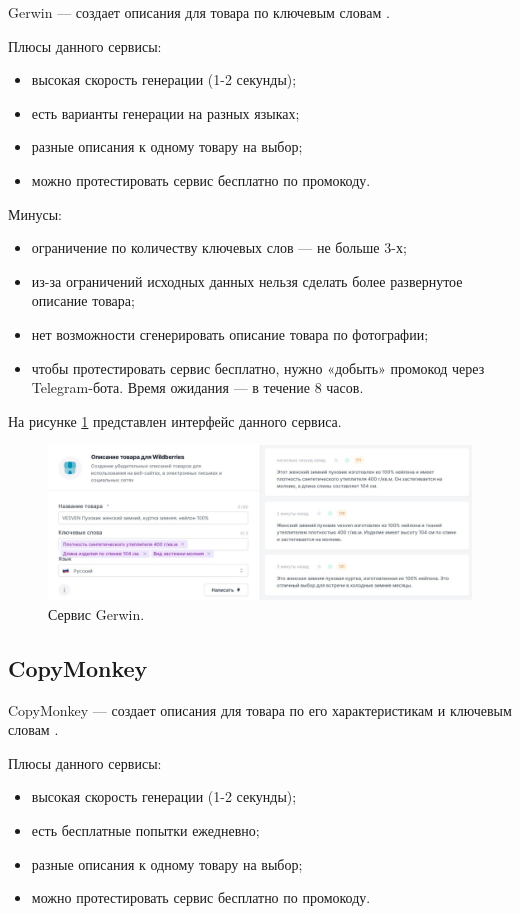 \documentclass[a4paper,12pt]{extarticle}
\begin{document}
Gerwin — создает описания для товара по ключевым словам \cite{gerwin}.

Плюсы данного сервисы:
\begin{itemize}
	\item высокая скорость генерации (1-2 секунды);
	\item есть варианты генерации на разных языках;
	\item разные описания к одному товару на выбор;
	\item можно протестировать сервис бесплатно по промокоду.
\end{itemize}

Минусы:
\begin{itemize}
	\item ограничение по количеству ключевых слов — не больше 3-х;
	\item из-за ограничений исходных данных нельзя сделать более развернутое описание товара;
	\item нет возможности сгенерировать описание товара по фотографии;
	\item чтобы протестировать сервис бесплатно, нужно «добыть» промокод через Telegram-бота. Время ожидания — в течение 8 часов.
\end{itemize}

На рисунке \ref{fig:gerwin} представлен интерфейс данного сервиса.

\begin{figure}[ht]
	\centering
	\includegraphics[scale=0.15]{gerwin.png}
	\caption{Сервис Gerwin.}
	\label{fig:gerwin}
\end{figure}

\newpage
\subsection{CopyMonkey}

CopyMonkey — создает описания для товара по его характеристикам и ключевым словам \cite{copymonkey}.

Плюсы данного сервисы:
\begin{itemize}
	\item высокая скорость генерации (1-2 секунды);
	\item есть бесплатные попытки ежедневно;
	\item разные описания к одному товару на выбор;
	\item можно протестировать сервис бесплатно по промокоду.
\end{itemize}
\end{document}
